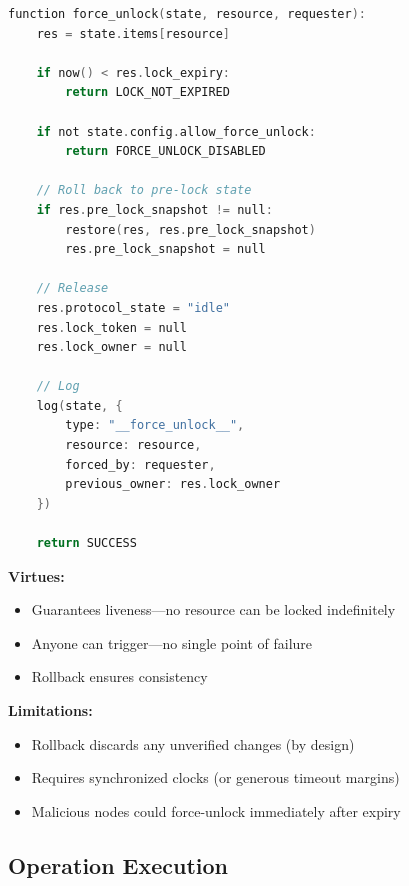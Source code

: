 \documentclass[sigconf,nonacm]{acmart}
\begin{document}
\begin{lstlisting}[language=C]
function force_unlock(state, resource, requester):
    res = state.items[resource]

    if now() < res.lock_expiry:
        return LOCK_NOT_EXPIRED

    if not state.config.allow_force_unlock:
        return FORCE_UNLOCK_DISABLED

    // Roll back to pre-lock state
    if res.pre_lock_snapshot != null:
        restore(res, res.pre_lock_snapshot)
        res.pre_lock_snapshot = null

    // Release
    res.protocol_state = "idle"
    res.lock_token = null
    res.lock_owner = null

    // Log
    log(state, {
        type: "__force_unlock__",
        resource: resource,
        forced_by: requester,
        previous_owner: res.lock_owner
    })

    return SUCCESS
\end{lstlisting}

\textbf{Virtues:}
\begin{itemize}
    \item Guarantees liveness---no resource can be locked indefinitely
    \item Anyone can trigger---no single point of failure
    \item Rollback ensures consistency
\end{itemize}

\textbf{Limitations:}
\begin{itemize}
    \item Rollback discards any unverified changes (by design)
    \item Requires synchronized clocks (or generous timeout margins)
    \item Malicious nodes could force-unlock immediately after expiry
\end{itemize}

\subsection{Operation Execution}
\end{document}
